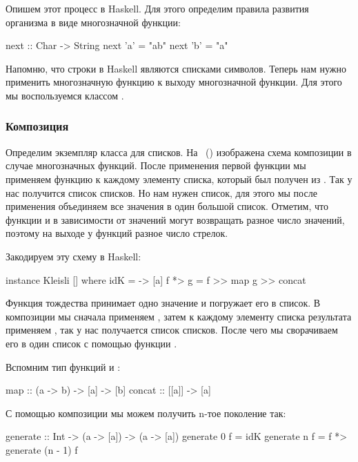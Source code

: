 Опишем этот процесс в Haskell. Для этого определим правила развития
организма в виде многозначной функции:


\begin{code}
next :: Char -> String
next 'a' = "ab"
next 'b' = "a"
\end{code}

Напомню, что строки в Haskell являются списками символов. Теперь нам
нужно применить многозначную функцию к выходу многозначной функции. Для
этого мы воспользуемся классом .

\subsubsection{Композиция}


Определим экземпляр класса  для списков. На
~() изображена схема композиции в случае многозначных
функций. После применения первой функции  мы применяем функцию к
каждому элементу списка, который был получен из . Так у нас
получится список списков. Но нам нужен список, для этого мы после
применения  объединяем все значения в один большой список.
Отметим, что функции  и  в зависимости от значений могут
возвращать разное число значений, поэтому на выходе у функций 
разное число стрелок.

Закодируем эту схему в Haskell:


\begin{code}
instance Kleisli [] where
    idK     = \a -> [a]
    f *> g  = f >> map g >> concat
\end{code}

Функция тождества принимает одно значение и погружает его в список. В
композиции мы сначала применяем , затем к каждому элементу списка
результата применяем , так у нас получается список списков. После
чего мы сворачиваем его в один список с помощью функции .

Вспомним тип функций  и :


\begin{code}
map     :: (a -> b) -> [a] -> [b]
concat  :: [[a]] -> [a]
\end{code}

С помощью композиции мы можем получить n-тое поколение так:


\begin{code}
generate :: Int -> (a -> [a]) -> (a -> [a])
generate 0 f = idK
generate n f = f *> generate (n - 1) f
\end{code}

